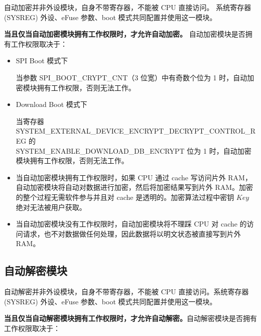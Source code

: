 \documentclass[main\_\_CN.tex]{subfiles}
\begin{document}
自动加密并非外设模块，自身不带寄存器，不能被 CPU 直接访问。
系统寄存器 (SYSREG) 外设、eFuse 参数、boot 模式共同配置并使用这一模块。

\textbf{当且仅当自动加密模块拥有工作权限时，才允许自动加密。} 自动加密模块是否拥有工作权限取决于：

\begin{itemize}

    \item SPI Boot 模式下

    当参数 SPI\_BOOT\_CRYPT\_CNT（3 位宽）中有奇数个位为 1 时，自动加密模块拥有工作权限，否则无法工作。

    \item Download Boot 模式下

    当寄存器 SYSTEM\_EXTERNAL\_DEVICE\_ENCRYPT\_DECRYPT\_CONTROL\_REG 的\\ SYSTEM\_ENABLE\_DOWNLOAD\_DB\_ENCRYPT 位为 1 时，自动加密模块拥有工作权限，否则无法工作。

\end{itemize}


\begin{tiplisting}
\vspace{-2em}
\begin{itemize}

\item 当自动加密模块拥有工作权限时，如果 CPU 通过 cache 写访问片外 RAM，自动加密模块将自动对数据进行加密，然后将加密结果写到片外 RAM。加密的整个过程无需软件参与并且对 cache 是透明的。加密算法过程中密钥 \begin{math}Key\end{math} 绝对无法被用户获取。

\item 当自动加密模块没有工作权限时，自动加密模块将不理踩 CPU 对 cache 的访问请求，也不对数据做任何处理，因此数据将以明文状态被直接写到片外 RAM。

\end{itemize}
\end{tiplisting}

\subsection{自动解密模块}

自动解密并非外设模块，自身不带寄存器，不能被 CPU 直接访问。系统寄存器 (SYSREG) 外设、eFuse 参数、boot 模式共同配置并使用这一模块。

\textbf{当且仅当自动解密模块拥有工作权限时，才允许自动解密。}自动解密模块是否拥有工作权限取决于：
\end{document}
